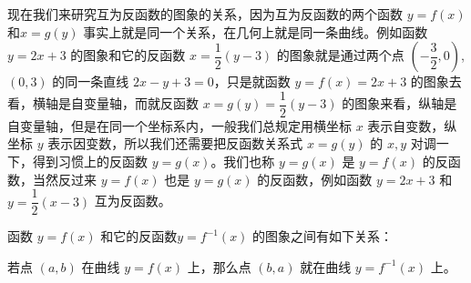 \begin{figure}
    \caption{}\label{fig:inverse_function}
\end{figure}

{\linespread{1.6}\selectfont 现在我们来研究互为反函数的图象的关系，因为互为反函数的两个函数 $y=f(x)$ 和$x=g(y)$ 事实上就是同一个关系，在几何上就是同一条曲线。例如函数 $y=2x+3$ 的图象和它的反函数 $x=\dfrac{1}{2}(y-3)$ 的图象就是通过两个点 $\left(-\dfrac{3}{2},0\right)$, $(0,3)$ 的同一条直线 $2x-y+3=0$，只是就函数 $y=f(x)=2x+3$ 的图象去看，横轴是自变量轴，而就反函数 $x=g(y)=\dfrac{1}{2}(y-3)$ 的图象来看，纵轴是自变量轴，但是在同一个坐标系内，一般我们总规定用横坐标 $x$ 表示自变数，纵坐标 $y$ 表示因变数，所以我们还需要把反函数关系式 $x=g(y)$ 的 $x,y$ 对调一下，得到习惯上的反函数 $y=g(x)$。我们也称 $y=g(x)$ 是 $y=f(x)$ 的反函数，当然反过来 $y=f(x)$ 也是 $y=g(x)$ 的反函数，例如函数 $y=2x+3$ 和 $y=\dfrac{1}{2}(x-3)$ 互为反函数。\par}

\medskip
函数 $y=f(x)$ 和它的反函数$y=f^{-1}(x)$ 的图象之间有如下关系：

若点 $(a,b)$ 在曲线 $y=f(x)$ 上，那么点 $(b,a)$ 就在曲线 $y=f^{-1}(x)$ 上。

